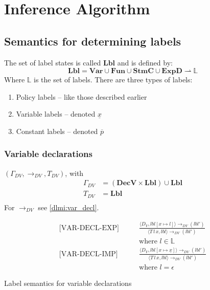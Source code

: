 
\newcommand{\iVar}{\mathbf{Var}}
\newcommand{\iFun}{\mathbf{Fun}}
\newcommand{\iDecv}{\mathbf{DecV}}
\newcommand{\iDecf}{\mathbf{DecF}}
\newcommand{\iStmc}{\mathbf{StmC}}
\newcommand{\iExpd}{\mathbf{ExpD}}
\newcommand{\iLbl}{\mathbf{Lbl}}

\newcommand{\trtspc}{\hspace{2em}} %

\section{Inference Algorithm}

\subsection{Semantics for determining labels}
The set of label states is called $\iLbl$ and is defined by:
\[
  \iLbl = \iVar \cup \iFun \cup \iStmc \cup \iExpd \rightharpoonup \mathbb{L}
\]
Where $\mathbb{L}$ is the set of labels.
There are three types of labels:
\begin{enumerate}
  \item Policy labels -- like those described earlier
  \item Variable labels -- denoted $\underline{x}$
  \item Constant labels -- denoted $\overline{p}$
\end{enumerate}

\subsubsection{Variable declarations}
$(\Gamma_{DV}, \rightarrow_{DV}, T_{DV})$, with
\begin{align*}
  \Gamma_{DV} & = (\iDecv \times \iLbl) \cup \iLbl \\
  T_{DV} & = \iLbl \\
\end{align*}
For $\rightarrow_{DV}$ see \cref{dlmi:var_decl}.

\begin{table}
\begin{align*}
  \text{[VAR-DECL-EXP]} \trtspc & \frac{
    \langle D_V, lbl[x \mapsto l] \rangle \rightarrow_{DV} (lbl')
  }{
    \langle T \, l \, x, lbl \rangle \rightarrow_{DV} (lbl')
  }\\
  & \text{where } l \in \mathbb{L}\\[2em]
  \text{[VAR-DECL-IMP]} \trtspc & \frac{
    \langle D_V, lbl[x \mapsto \underline{x}] \rangle \rightarrow_{DV} (lbl')
  }{
    \langle T \, l \, x, lbl \rangle \rightarrow_{DV} (lbl')
  }\\
  & \text{where } l = \epsilon
\end{align*}
\caption{Label semantics for variable declarations}
\label{dlmi:var_decl}
\end{table}

